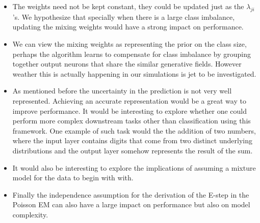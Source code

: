 \documentclass{article}
\begin{document}
\begin{itemize}
\item
	The weights need not be kept constant, they could be updated just as the $\lambda_{ji}$'s. We hypothesize that specially when there is a large class imbalance, updating the mixing weights would have a strong impact on performance.  
\item 
	We can view the mixing weights as representing the prior on the class size, perhaps the algorithm learns to compensate for class imbalance by grouping together output neurons that share the similar generative fields. However weather this is actually happening in our simulations is jet to be investigated. 
\item
	As mentioned before the uncertainty in the prediction is not very well represented. Achieving an accurate representation would be a great way to improve performance. 
\itme
	It would be interesting to explore whether one could perform more complex downstream tasks other than classification using this framework. One example of such task would the the addition of two numbers, where the input layer contains digits that come from two distinct underlying distributions and the output layer somehow represents the result of the sum. 
\item
	It would also be interesting to explore the implications of assuming a mixture model for the data to begin with with.
\item
	Finally the independence assumption for the derivation of the E-step in the Poisson EM can also have a large impact on performance but also on model complexity. 
\end{itemize}

\pagebreak
\printbibliography
\end{document}
